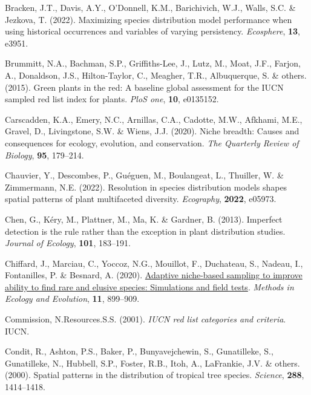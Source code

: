 \documentclass[
]{article}
\newlength{\cslhangindent}
\newenvironment{CSLReferences}[2] %
 {\begin{list}{}{%
  \setlength{\itemindent}{0pt}
  \setlength{\leftmargin}{0pt}
  \setlength{\parsep}{0pt}
  \ifodd #1
   \setlength{\leftmargin}{\cslhangindent}
   \setlength{\itemindent}{-1\cslhangindent}
  \fi
  \setlength{\itemsep}{#2\baselineskip}}}
 {\end{list}}
\begin{document}
\begin{CSLReferences}{1}{1}
Bracken, J.T., Davis, A.Y., O'Donnell, K.M., Barichivich, W.J., Walls,
S.C. \& Jezkova, T. (2022). Maximizing species distribution model
performance when using historical occurrences and variables of varying
persistency. \emph{Ecosphere}, \textbf{13}, e3951.

Brummitt, N.A., Bachman, S.P., Griffiths-Lee, J., Lutz, M., Moat, J.F.,
Farjon, A., Donaldson, J.S., Hilton-Taylor, C., Meagher, T.R.,
Albuquerque, S. \& others. (2015). Green plants in the red: A baseline
global assessment for the IUCN sampled red list index for plants.
\emph{PloS one}, \textbf{10}, e0135152.

Carscadden, K.A., Emery, N.C., Arnillas, C.A., Cadotte, M.W., Afkhami,
M.E., Gravel, D., Livingstone, S.W. \& Wiens, J.J. (2020). Niche
breadth: Causes and consequences for ecology, evolution, and
conservation. \emph{The Quarterly Review of Biology}, \textbf{95},
179--214.

Chauvier, Y., Descombes, P., Guéguen, M., Boulangeat, L., Thuiller, W.
\& Zimmermann, N.E. (2022). Resolution in species distribution models
shapes spatial patterns of plant multifaceted diversity.
\emph{Ecography}, \textbf{2022}, e05973.

Chen, G., Kéry, M., Plattner, M., Ma, K. \& Gardner, B. (2013).
Imperfect detection is the rule rather than the exception in plant
distribution studies. \emph{Journal of Ecology}, \textbf{101}, 183--191.

Chiffard, J., Marciau, C., Yoccoz, N.G., Mouillot, F., Duchateau, S.,
Nadeau, I., Fontanilles, P. \& Besnard, A. (2020).
\href{https://doi.org/10.1111/2041-210X.13399}{Adaptive niche-based
sampling to improve ability to find rare and elusive species:
Simulations and field tests}. \emph{Methods in Ecology and Evolution},
\textbf{11}, 899--909.

Commission, N.Resources.S.S. (2001). \emph{IUCN red list categories and
criteria}. IUCN.

Condit, R., Ashton, P.S., Baker, P., Bunyavejchewin, S., Gunatilleke,
S., Gunatilleke, N., Hubbell, S.P., Foster, R.B., Itoh, A., LaFrankie,
J.V. \& others. (2000). Spatial patterns in the distribution of tropical
tree species. \emph{Science}, \textbf{288}, 1414--1418.


\end{CSLReferences}
\end{document}
